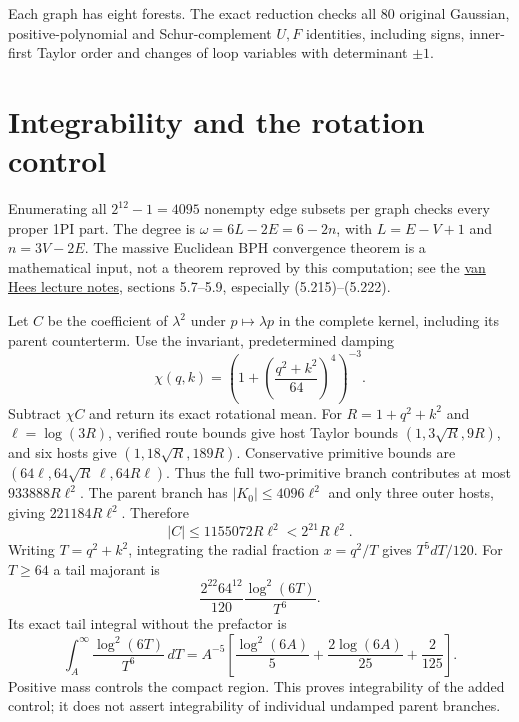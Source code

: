 \documentclass[11pt]{article}
\begin{document}
Each graph has eight forests. The exact reduction checks all 80 original Gaussian,
positive-polynomial and Schur-complement $U,F$ identities, including signs,
inner-first Taylor order and changes of loop variables with determinant $\pm1$.

\section*{Integrability and the rotation control}
Enumerating all $2^{12}-1=4095$ nonempty edge subsets per graph checks every proper
1PI part. The degree is $\omega=6L-2E=6-2n$, with $L=E-V+1$ and $n=3V-2E$.
The massive Euclidean BPH convergence theorem is a mathematical input, not a theorem
reproved by this computation; see the \href{https://itp.uni-frankfurt.de/~hees/publ/lect.pdf}
{van Hees lecture notes}, sections 5.7--5.9, especially (5.215)--(5.222).

Let $C$ be the coefficient of $\lambda^2$ under $p\mapsto\lambda p$ in the complete
kernel, including its parent counterterm. Use the invariant, predetermined damping
\begin{equation}
 \chi(q,k)=\left(1+\left(\frac{q^2+k^2}{64}\right)^4\right)^{-3}.
\end{equation}
Subtract $\chi C$ and return its exact rotational mean. For $R=1+q^2+k^2$
and $\ell=\log(3R)$, verified route bounds give host Taylor bounds
$(1,3\sqrt R,9R)$, and six hosts give $(1,18\sqrt R,189R)$.
Conservative primitive bounds are $(64\ell,64\sqrt R\,\ell,64R\ell)$.
Thus the full two-primitive branch contributes at most $933888R\ell^2$.
The parent branch has $|K_0|\leq4096\ell^2$ and only three outer hosts, giving
$221184R\ell^2$. Therefore
\begin{equation}
 |C|\leq1155072R\ell^2<2^{21}R\ell^2.
\end{equation}
Writing $T=q^2+k^2$, integrating the radial fraction $x=q^2/T$ gives
$T^5dT/120$. For $T\geq64$ a tail majorant is
\begin{equation}
 \frac{2^{22}64^{12}}{120}\frac{\log^2(6T)}{T^6}.
\end{equation}
Its exact tail integral without the prefactor is
\begin{equation}
 \int_A^\infty \frac{\log^2(6T)}{T^6}\,dT
 = A^{-5}\left[\frac{\log^2(6A)}5+
 \frac{2\log(6A)}{25}+\frac2{125}\right].
\end{equation}
Positive mass controls the compact region. This proves integrability of the added
control; it does not assert integrability of individual undamped parent branches.
\end{document}

